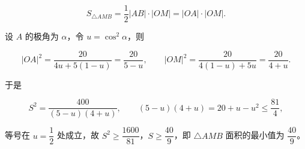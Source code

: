 \begin{answer}
\nopagebreak[4]
\[S_{\triangle AMB}=\frac12|AB|\cdot|OM|=|OA|\cdot|OM|.\]

设 $A$ 的极角为 $\alpha$，令 $u=\cos^2\alpha$，则

\nopagebreak[4]
\[|OA|^2=\frac{20}{4u+5(1-u)}=\frac{20}{5-u},\qquad |OM|^2=\frac{20}{4(1-u)+5u}=\frac{20}{4+u}.\]

于是

\nopagebreak[4]
\[S^2=\frac{400}{(5-u)(4+u)},\qquad (5-u)(4+u)=20+u-u^2\leqslant\frac{81}4,\]

等号在 $u=\dfrac12$ 处成立，故 $S^2\geqslant\dfrac{1600}{81}$，$S\geqslant\dfrac{40}9$，即 $\triangle AMB$ 面积的最小值为 $\dfrac{40}9$。


\end{answer}